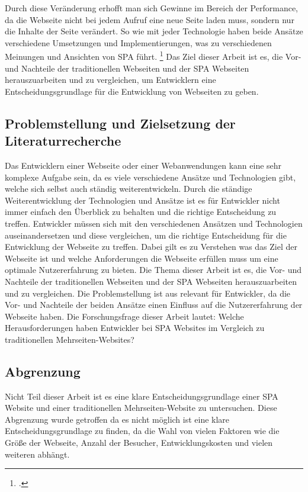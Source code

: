 Durch diese Veränderung erhofft man sich Gewinne im Bereich der Performance, da die Webseite nicht bei jedem Aufruf eine neue Seite laden muss, sondern nur die Inhalte der Seite verändert.
So wie mit jeder Technologie haben beide Ansätze verschiedene Umsetzungen und Implementierungen, was zu verschiedenen Meinungen und Ansichten von \ac{SPA} führt. \footcite[Vgl.][Seite 4]{Flanagan2011}
Das Ziel dieser Arbeit ist es, die Vor- und Nachteile der traditionellen Webseiten und der \ac{SPA} Webseiten herauszuarbeiten und zu vergleichen,
um Entwicklern eine Entscheidungsgrundlage für die Entwicklung von Webseiten zu geben.

\subsection{Problemstellung und Zielsetzung der Literaturrecherche}
Das Entwicklern einer Webseite oder einer Webanwendungen kann eine sehr komplexe Aufgabe sein, da es viele verschiedene Ansätze und Technologien gibt, welche sich selbst auch ständig weiterentwickeln.
Durch die ständige Weiterentwicklung der Technologien und Ansätze ist es für Entwickler nicht immer einfach den Überblick zu behalten und die richtige Entscheidung zu treffen.
Entwickler müssen sich mit den verschiedenen Ansätzen und Technologien auseinandersetzen und diese vergleichen, um die richtige Entscheidung für die Entwicklung der Webseite zu treffen.
Dabei gilt es zu Verstehen was das Ziel der Webseite ist und welche Anforderungen die Webseite erfüllen muss um eine optimale Nutzererfahrung zu bieten.
Die Thema dieser Arbeit ist es, die Vor- und Nachteile der traditionellen Webseiten und der \ac{SPA} Webseiten herauszuarbeiten und zu vergleichen.
Die Problemstellung ist aus relevant für Entwickler, da die Vor- und Nachteile der beiden Ansätze einen Einfluss auf die Nutzererfahrung der Webseite haben.
Die Forschungsfrage dieser Arbeit lautet: Welche Herausforderungen haben Entwickler bei \ac{SPA} Websites im Vergleich zu traditionellen Mehrseiten-Websites?

\subsection{Abgrenzung}
Nicht Teil dieser Arbeit ist es eine klare Entscheidungsgrundlage einer \ac{SPA} Website und einer traditionellen Mehrseiten-Website zu untersuchen.
Diese Abgrenzung wurde getroffen da es nicht möglich ist eine klare Entscheidungsgrundlage zu finden, da die Wahl von vielen Faktoren wie die Größe der Webseite,
Anzahl der Besucher, Entwicklungskosten und vielen weiteren abhängt.

